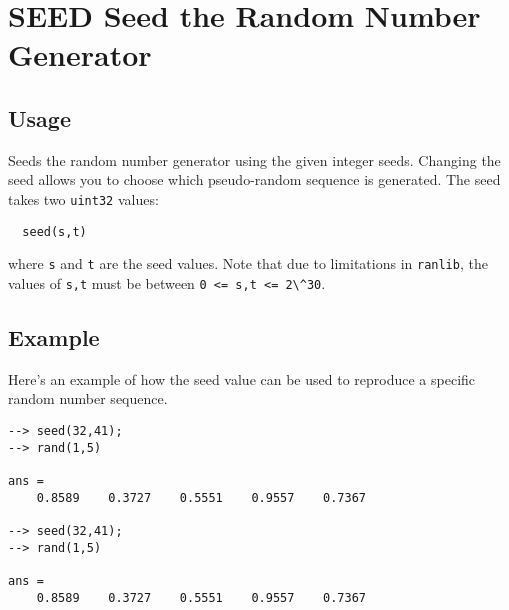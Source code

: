\section{SEED Seed the Random Number Generator}

\subsection{Usage}

Seeds the random number generator using the given integer seeds.  
Changing the seed allows you to choose which pseudo-random
sequence is generated.  The seed takes two \verb|uint32| values:
\begin{verbatim}
  seed(s,t)
\end{verbatim}
where \verb|s| and \verb|t| are the seed values.  Note that due to limitations
in \verb|ranlib|, the values of \verb|s,t| must be between \verb|0 <= s,t <= 2\^30|.
\subsection{Example}

Here's an example of how the seed value can be used to reproduce
a specific random number sequence.
\begin{verbatim}
--> seed(32,41);
--> rand(1,5)

ans = 
    0.8589    0.3727    0.5551    0.9557    0.7367 

--> seed(32,41);
--> rand(1,5)

ans = 
    0.8589    0.3727    0.5551    0.9557    0.7367 
\end{verbatim}
